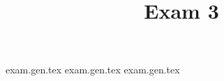 

\title{Exam 3}
\date{}



\examcover

{exam.gen.tex}
\newpage
{exam.gen.tex}
\newpage
{exam.gen.tex}


